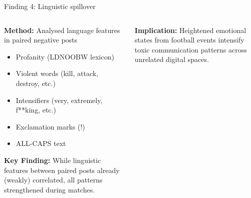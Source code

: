 \documentclass[10pt]{beamer}
\begin{document}
\begin{frame}{Finding 4: Linguistic spillover}
\begin{columns}
\begin{column}{0.45\textwidth}
\textbf{Method:} Analysed language features in paired negative posts
{\footnotesize
\begin{itemize}
\item Profanity (LDNOOBW lexicon)
\item Violent words (kill, attack, destroy, etc.)
\item Intensifiers (very, extremely, f**king, etc.)
\item Exclamation marks (!)
\item ALL-CAPS text
\end{itemize}
}

\vspace{0.5em}
\textbf{Key Finding:} While linguistic features between paired posts already (weakly) correlated, all patterns strengthened during matches.

\end{column}

\begin{column}{0.55\textwidth}
\begin{table}
\centering
{}
\caption{Linguistic spillover between FC and non-FC subreddits.}
\label{tab:lang_tau_difference}
\end{table}

\textbf{Implication:} Heightened emotional states from football events intensify toxic communication patterns across unrelated digital spaces.

\end{column}
\end{columns}

\end{frame}
\end{document}
